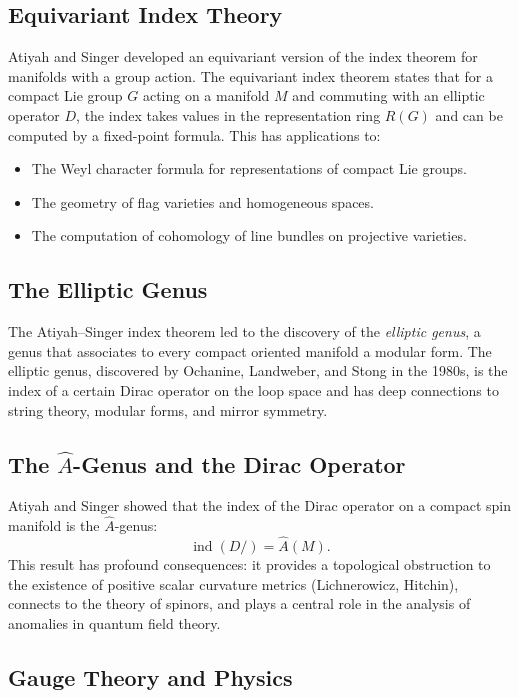 \subsection{Equivariant Index Theory}

Atiyah and Singer developed an equivariant version of the index theorem for manifolds with a group action. The equivariant index theorem states that for a compact Lie group $G$ acting on a manifold $M$ and commuting with an elliptic operator $D$, the index takes values in the representation ring $R(G)$ and can be computed by a fixed-point formula. This has applications to:
\begin{itemize}
\item The Weyl character formula for representations of compact Lie groups.
\item The geometry of flag varieties and homogeneous spaces.
\item The computation of cohomology of line bundles on projective varieties.
\end{itemize}

\subsection{The Elliptic Genus}

The Atiyah--Singer index theorem led to the discovery of the \emph{elliptic genus}, a genus that associates to every compact oriented manifold a modular form. The elliptic genus, discovered by Ochanine, Landweber, and Stong in the 1980s, is the index of a certain Dirac operator on the loop space and has deep connections to string theory, modular forms, and mirror symmetry.

\subsection{The \texorpdfstring{$\widehat A$}{A}-Genus and the Dirac Operator}

Atiyah and Singer showed that the index of the Dirac operator on a compact spin manifold is the $\widehat A$-genus:
\[
\operatorname{ind}(D\!\!\!\!/) = \widehat A(M).
\]
This result has profound consequences: it provides a topological obstruction to the existence of positive scalar curvature metrics (Lichnerowicz, Hitchin), connects to the theory of spinors, and plays a central role in the analysis of anomalies in quantum field theory.

\subsection{Gauge Theory and Physics}

